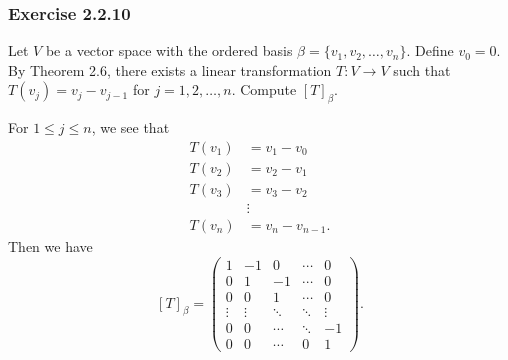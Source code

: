 \subsubsection{Exercise 2.2.10} Let \( V  \) be a vector space with the ordered basis \( \beta = \{ {v}_{1}, {v}_{2}, \dots, {v}_{n} \}.  \) Define \( {v}_{0} = 0  \). By Theorem 2.6, there exists a linear transformation \( T: V \to V  \) such that \( T({v}_{j}) = {v}_{j} - {v}_{j-1}  \) for \( j = 1, 2, \dots, n \). Compute \( [T]_{\beta}^{}  \).
\begin{solution}
For \( 1 \leq j \leq n  \), we see that 
\begin{align*}
    T({v}_{1}) &= {v}_{1} - {v}_{0} \\
    T({v}_{2}) &= {v}_{2} - {v}_{1} \\ 
    T({v}_{3}) &= {v}_{3} - {v}_{2} \\
               &\vdots \\
    T({v}_{n}) &= {v}_{n} - {v}_{n-1}.
\end{align*}
Then we have
\[ {[T]}_{\beta} = \begin{pmatrix}
    1 & -1 & 0 & \cdots & 0 \\
    0 & 1 & -1 & \cdots & 0 \\
    0 & 0 & 1 & \cdots & 0 \\
    \vdots & \vdots & \ddots  & \ddots & \vdots \\
    0 & 0 &  \cdots & \ddots  &   - 1 \\
    0 & 0 & \cdots & 0 & 1 
\end{pmatrix}.  \]
\end{solution}


